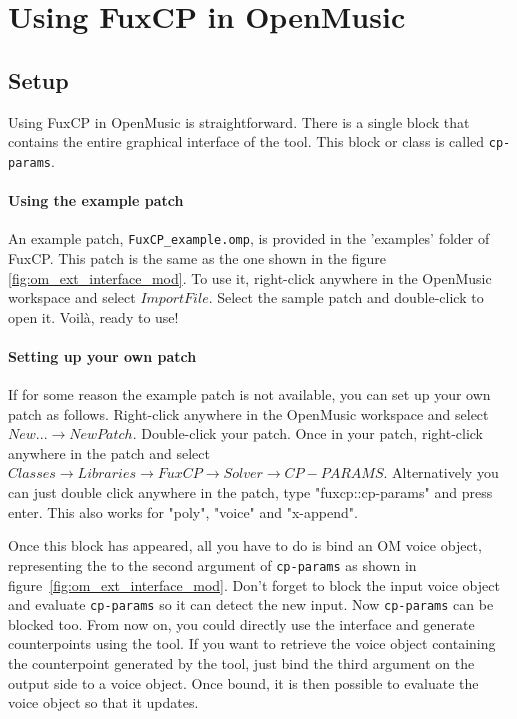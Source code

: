 \section{Using FuxCP in OpenMusic}
\subsection*{Setup}
Using FuxCP in OpenMusic is straightforward. There is a single block that contains the entire graphical interface of the tool. This block or class is called \texttt{cp-params}.
\paragraph{Using the example patch}
An example patch, \texttt{FuxCP\_example.omp}, is provided in the 'examples' folder of FuxCP. This patch is the same as the one shown in the figure \ref{fig:om_ext_interface_mod}. To use it, right-click anywhere in the OpenMusic workspace and select $\mathit{Import File}$. Select the sample patch and double-click to open it. Voilà, ready to use!

\paragraph{Setting up your own patch}
If for some reason the example patch is not available, you can set up your own patch as follows. Right-click anywhere in the OpenMusic workspace and select $New...\to New Patch$. Double-click your patch. Once in your patch, right-click anywhere in the patch and select $\mathit{Classes}\to \mathit{Libraries}\to \mathit{FuxCP}\to \mathit{Solver}\to \mathit{CP-PARAMS}$. Alternatively you can just double click anywhere in the patch, type "fuxcp::cp-params" and press enter. This also works for "poly", "voice" and "x-append".

Once this block has appeared, all you have to do is bind an OM voice object, representing the \cfcomma to the second argument of \texttt{cp-params} as shown in figure~\ref{fig:om_ext_interface_mod}. Don't forget to block the input voice object and evaluate \texttt{cp-params} so it can detect the new input. Now \texttt{cp-params} can be blocked too. From now on, you could directly use the interface and generate counterpoints using the tool. If you want to retrieve the voice object containing the counterpoint generated by the tool, just bind the third argument on the output side to a voice object. Once bound, it is then possible to evaluate the voice object so that it updates.

